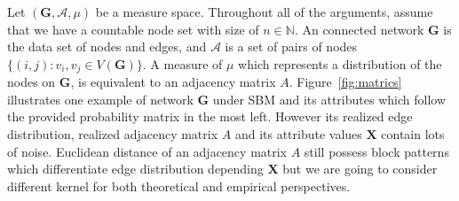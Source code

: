 \documentclass[12pt]{article}
\theoremstyle{definition}
\begin{document}
Let $(\mathbf{G}, \mathcal{A}, \mu)$ be a measure space. Throughout all of the arguments, assume that we have a countable node set with size of $n \in \mathbb{N}$. An connected network $\mathbf{G}$ is the data set of nodes and edges, and $\mathcal{A}$ is a set of pairs of nodes $\{(i,j) : v_{i}, v_{j} \in V(\mathbf{G}) \}$. A measure of $\mu$ which represents a distribution of the nodes on $\mathbf{G}$, is equivalent to an adjacency matrix $A$. Figure~\ref{fig:matrics} illustrates one example of network $\mathbf{G}$ under SBM and its attributes which follow the provided probability matrix in the most left. However its realized edge distribution, realized adjacency matrix $A$ and its attribute values $\mathbf{X}$ contain lots of noise. Euclidean distance of an adjacency matrix $A$ still possess block patterns which differentiate edge distribution depending $\mathbf{X}$ but we are going to consider different kernel for both theoretical and empirical perspectives. 
	
\end{document}
